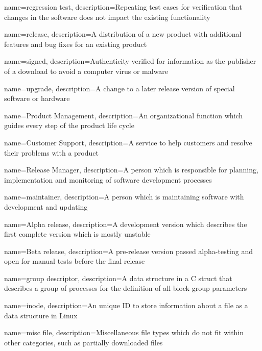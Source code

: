{
    name={regression test},
    description={Repeating test cases for verification that changes in the software does not impact the existing functionality}
}

{
    name={release},
    description={A distribution of a new product with additional features and bug fixes for an existing product}
}

{
    name={signed},
    description={Authenticity verified for information as the publisher of a download to avoid a computer virus or malware}
}

{
    name={upgrade},
    description={A change to a later release version of special software or hardware}
}

{
    name={Product Management},
    description={An organizational function which guides every step of the product life cycle}
}

{
    name={Customer Support},
    description={A service to help customers and resolve their problems with a product}
}

{
    name={Release Manager},
    description={A person which is responsible for planning, implementation and monitoring of software development processes}
}

{
    name={maintainer},
    description={A person which is maintaining software with development and updating}
}

{
    name={Alpha release},
    description={A development version which describes the first complete version which is mostly unstable}
}

{
    name={Beta release},
    description={A pre-release version passed alpha-testing and open for manual tests before the final release}
}

{
    name={group descriptor},
    description={A data structure in a C struct that describes a group of processes for the definition of all block group parameters}
}

{
    name={inode},
    description={An unique ID to store information about a file as a data structure in Linux}
}

{
    name={misc file},
    description={Miscellaneous file types which do not fit within other categories, such as partially downloaded files}
}

